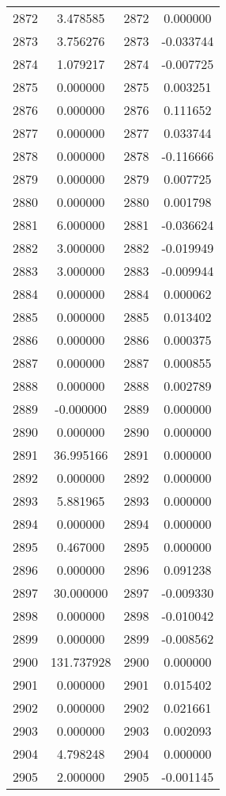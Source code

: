 \documentclass[12pt]{article}
\begin{document}
\begin{longtable}{@{}cccc@{}}
2872 & 3.478585 & 2872 & 0.000000 \\
2873 & 3.756276 & 2873 & -0.033744 \\
2874 & 1.079217 & 2874 & -0.007725 \\
2875 & 0.000000 & 2875 & 0.003251 \\
2876 & 0.000000 & 2876 & 0.111652 \\
2877 & 0.000000 & 2877 & 0.033744 \\
2878 & 0.000000 & 2878 & -0.116666 \\
2879 & 0.000000 & 2879 & 0.007725 \\
2880 & 0.000000 & 2880 & 0.001798 \\
2881 & 6.000000 & 2881 & -0.036624 \\
2882 & 3.000000 & 2882 & -0.019949 \\
2883 & 3.000000 & 2883 & -0.009944 \\
2884 & 0.000000 & 2884 & 0.000062 \\
2885 & 0.000000 & 2885 & 0.013402 \\
2886 & 0.000000 & 2886 & 0.000375 \\
2887 & 0.000000 & 2887 & 0.000855 \\
2888 & 0.000000 & 2888 & 0.002789 \\
2889 & -0.000000 & 2889 & 0.000000 \\
2890 & 0.000000 & 2890 & 0.000000 \\
2891 & 36.995166 & 2891 & 0.000000 \\
2892 & 0.000000 & 2892 & 0.000000 \\
2893 & 5.881965 & 2893 & 0.000000 \\
2894 & 0.000000 & 2894 & 0.000000 \\
2895 & 0.467000 & 2895 & 0.000000 \\
2896 & 0.000000 & 2896 & 0.091238 \\
2897 & 30.000000 & 2897 & -0.009330 \\
2898 & 0.000000 & 2898 & -0.010042 \\
2899 & 0.000000 & 2899 & -0.008562 \\
2900 & 131.737928 & 2900 & 0.000000 \\
2901 & 0.000000 & 2901 & 0.015402 \\
2902 & 0.000000 & 2902 & 0.021661 \\
2903 & 0.000000 & 2903 & 0.002093 \\
2904 & 4.798248 & 2904 & 0.000000 \\
2905 & 2.000000 & 2905 & -0.001145 \\

\end{longtable}
\end{document}

